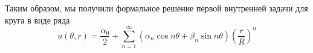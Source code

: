 Таким образом, мы получили формальное решение первой внутренней задачи для круга в виде ряда
\begin{equation}
	u(\theta, r) =  \frac{\alpha_0}{2} + \sum\limits_{n = 1}^{\infty} (\alpha_n \cos n \theta + \beta_n \sin n \theta) \left(\frac{r}{R} \right)^n
	\label{equ:equSolveDirihletProblemRow}
\end{equation}